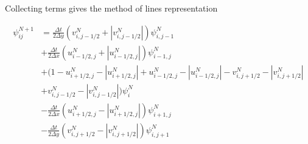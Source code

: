 \documentclass[10pt, a4paper]{article}
\newcommand{\abs}[1]{\left\lvert#1\right\rvert}
\begin{document}
Collecting terms gives the method of lines representation

\begin{equation}
\begin{split}
\psi_{ij}^{N+1} &=
\frac{\Delta t}{2 \Delta y} \left( v_{i,j-1/2}^N + \abs{v_{i,j-1/2}^N} \right) \psi_{i,j-1}^N\\
&+\frac{\Delta t}{2 \Delta x} \left( u_{i-1/2,j}^N + \abs{u_{i-1/2,j}^N} \right) \psi_{i-1,j}^N\\
&+ \Big(1 - u_{i+1/2,j}^N - \abs{u_{i+1/2,j}^N} + u_{i-1/2,j}^N - \abs{u_{i-1/2,j}^N} - v_{i,j+1/2}^N - \abs{v_{i,j+1/2}^N} \\
&+ v_{i,j-1/2}^N - \abs{v_{i,j-1/2}^N} \Big) \psi_i^N\\
&-\frac{\Delta t}{2 \Delta x} \left( u_{i+1/2,j}^N - \abs{u_{i+1/2,j}^N} \right) \psi_{i+1,j}^N\\
&-\frac{\Delta t}{2 \Delta y} \left( v_{i,j+1/2}^N - \abs{v_{i,j+1/2}^N} \right) \psi_{i,j+1}^N\\
\end{split}
\end{equation}



\end{document}
